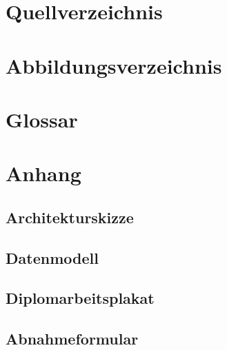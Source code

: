 \documentclass[pdftex,11pt,a4paper]{book}
\begin{document}
\chapter{Quellverzeichnis}

\chapter{Abbildungsverzeichnis}

\chapter{Glossar}

\chapter{Anhang}
\section{Architekturskizze}
\section{Datenmodell}
\section{Diplomarbeitsplakat}
\section{Abnahmeformular}
\end{document}
